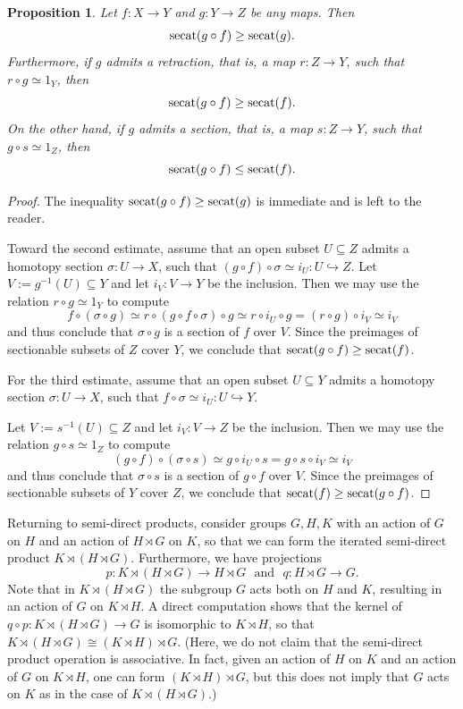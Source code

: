 \documentclass[11pt]{amsart}
\theoremstyle{plain}
\newtheorem{proposition}[theorem]{Proposition}
\theoremstyle{definition}
\newcommand{\secat}{\mathop{\rm secat}\nolimits}
\begin{document}
\begin{proposition}\label{prop:secat of composition}
Let $f\colon X\to Y$ and $g\colon Y\to Z$ be any maps. Then 
$$\secat(g\circ f)\ge\secat(g).$$
Furthermore, if $g$ admits a retraction, that is, a map $r\colon Z\to Y$, such that 
$r\circ g\simeq 1_Y$, then 
$$\secat(g\circ f)\ge\secat(f).$$
On the other hand, if $g$ admits a section, that is, a map $s\colon Z\to Y$, such that $g\circ s\simeq 1_Z$, then 
$$\secat(g\circ f)\le\secat(f).$$
\end{proposition}
\begin{proof} The inequality $\secat(g \circ f)\geq\secat(g)$ is immediate and is left to the reader. 

Toward the second estimate, assume that an open subset $U\subseteq Z$ admits a homotopy
section $\sigma\colon U\to X$, such that $(g\circ f)\circ \sigma\simeq i_U\colon U\hookrightarrow Z$.
Let $V:=g^{-1}(U)\subseteq Y$ and let $i_V\colon V\to Y$ be the inclusion. 
Then we may use the relation $r\circ g\simeq 1_Y$ to compute 
$$f\circ (\sigma\circ g)\simeq r\circ (g\circ f\circ \sigma)\circ g \simeq r\circ i_U\circ g
=(r\circ g)\circ i_V\simeq i_V$$
and thus conclude that $\sigma\circ g$ is a section of $f$ over $V$. Since the preimages of 
sectionable subsets of $Z$ cover $Y$, we conclude that $\secat(g\circ f)\ge\secat(f)$.

For the third estimate, assume that an open subset $U\subseteq Y$ admits a homotopy section 
$\sigma\colon U\to X$, such that $f\circ \sigma\simeq i_U\colon U\hookrightarrow Y$.

Let $V:=s^{-1}(U)\subseteq Z$ and let $i_V\colon V\to Z$ be the inclusion. 
Then we may use the relation $g\circ s\simeq 1_Z$ to compute 
$$(g\circ f)\circ (\sigma\circ s)\simeq g\circ i_U\circ s=g\circ s\circ i_V\simeq i_V$$
and thus conclude that $\sigma\circ s$ is a section of $g\circ f$ over $V$. Since the preimages of 
sectionable subsets of $Y$ cover $Z$, we conclude that $\secat(f)\ge \secat(g\circ f)$.
\end{proof}

Returning to semi-direct products, consider groups $G,H,K$ with an action of $G$ on $H$ and an 
action of $H\rtimes G$ on $K$, so that 
we can form the iterated semi-direct product $K\rtimes(H\rtimes G)$. Furthermore, we have projections
$$p\colon K\rtimes(H\rtimes G)\to H\rtimes G\ \ \ \text{and}\ \ \ q\colon H\rtimes G\to G.$$
Note that in $K\rtimes(H\rtimes G)$ the subgroup $G$ acts both on $H$ and $K$, resulting in
an action of $G$ on $K\rtimes H$. 
A direct computation shows that the kernel of $q\circ p\colon K\rtimes(H\rtimes G)\to G$ is 
isomorphic to $K\rtimes H$, so that $K\rtimes(H\rtimes G)\cong (K\rtimes H)\rtimes G$. (Here, we do not
claim that the semi-direct
product operation is associative. In fact, given an action of $H$ on $K$
and an action of $G$ on $K\rtimes H$, one can form $(K\rtimes H)\rtimes G$, but this does not imply
that $G$ acts on $K$ as in the case of $K\rtimes(H\rtimes G)$.)
\end{document}
